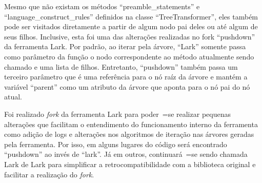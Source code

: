 Mesmo que não existam os métodos ``preamble\_statements'' e
``language\_construct\_rules'' definidos na classe ``TreeTransformer'',
eles também pode ser visitados diretamente a partir de algum nodo pai deles ou
até algum de seus filhos.
Inclusive,
esta foi uma das alterações realizadas no fork ``pushdown'' da ferramenta Lark.
Por padrão,
ao iterar pela árvore,
``Lark'' somente passa como parâmetro da função o nodo correspondente ao método atualmente sendo chamado e
uma lista de filhos.
Entretanto,
``pushdown'' também passa um terceiro parâmetro que é uma referência para o nó raíz da árvore e
mantém a variável ``parent'' como um atributo da árvore que aponta para o nó pai do nó atual.

Foi realizado \textit{fork} da ferramenta Lark para poder~=se realizar pequenas alterações que facilitam o entendimento do funcionamento interno da ferramenta como adição de logs e
alterações nos algoritmos de iteração nas árvores geradas pela ferramenta.
Por isso,
em alguns lugares do código será encontrado ``pushdown'' ao invés de ``lark''.
Já em outros,
continuará~=se sendo chamada Lark de Lark para simplificar a retrocompatibilidade com a biblioteca original e
facilitar a realização do \textit{fork}.
